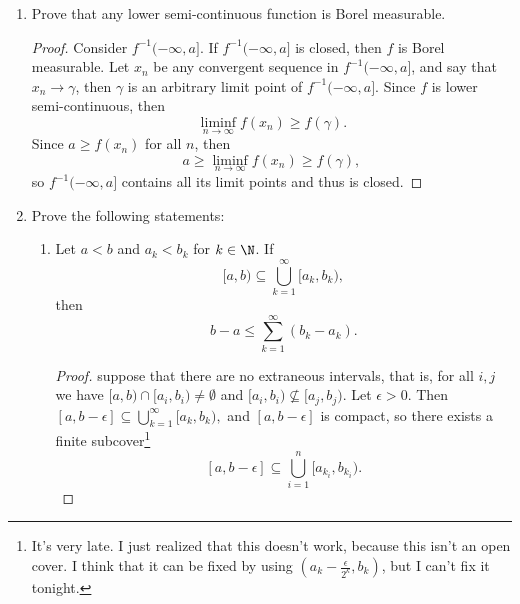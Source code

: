 \documentclass[12pt,letterpaper]{article}
\begin{document}
\begin{enumerate}[resume]
\item Prove that any lower semi-continuous function is Borel measurable. 
\begin{proof}
Consider ${f}^{-1}(-\infty,a]$. If ${f}^{-1}(-\infty,a]$ is closed, then $f$ is Borel measurable. Let $x_n$ be any convergent sequence in ${f}^{-1}(-\infty,a]$, and say that $x_n\to\gamma$, then $\gamma$ is an arbitrary limit point of ${f}^{-1}(-\infty,a]$. Since $f$ is lower semi-continuous, then 
$$\liminf_{n\to\infty} f(x_n) \geq f(\gamma).$$
Since $a\geq f(x_n)$ for all $n$, then 
$$a\geq\liminf_{n\to\infty} f(x_n) \geq f(\gamma),$$
so ${f}^{-1}(-\infty,a]$ contains all its limit points and thus is closed. 
\end{proof}

\item Prove the following statements:
	\begin{enumerate}[label=(\roman*)]
	\item Let $a<b$ and $a_k<b_k$ for $k\in\N$. If
	$$[a,b)\subseteq\bigcup_{k=1}^\infty[a_k,b_k),$$
	then 
	$$b-a\leq\sum_{k=1}^\infty(b_k-a_k).$$
	\begin{proof}
	\WLOG{} suppose that there are no extraneous intervals, that is,  for all $i, j$ we have $[a,b)\cap[{a}_i,{b}_i)\neq\emptyset$ and $[a_i,b_i)\not\subseteq[a_j,b_j)$. Let $\epsilon>0$. Then 	$[a,b-\epsilon]\subseteq\bigcup_{k=1}^\infty[a_k,b_k),$ and $[a,b-\epsilon]$ is compact, so there exists a finite subcover\footnote{It's very late. I just realized that this doesn't work, because this isn't an open cover. I think that it can be fixed by using $(a_k-\frac{\epsilon}{2^k},b_k)$, but I can't fix it tonight.}
	$$[a,b-\epsilon]\subseteq\bigcup_{i=1}^n[a_{k_i},b_{k_i}).$$
	

\end{proof}
\end{enumerate}
\end{enumerate}
\end{document}

